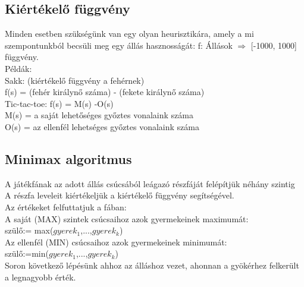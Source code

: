 \documentclass{article}
\begin{document}
	 \subsection{Kiértékelő függvény}
	 Minden esetben szükségünk van egy olyan heurisztikára, amely a mi szempontunkból becsüli meg egy állás hasznosságát: f: Állások $\Rightarrow$ [-1000, 1000] függvény.\\
	 Példák: \\
	 Sakk: (kiértékelő függvény a fehérnek)\\
	 f(s) = (fehér királynő száma) - (fekete királynő száma)\\
	 Tic-tac-toe: f(s) = M(s) -O(s)\\
	 M(s) = a saját lehetőséges győztes vonalaink száma\\
	 O(s) = az ellenfél lehetséges győztes vonalaink száma\\
	 
	 \subsection{Minimax algoritmus}
	 A játékfának az adott állás csúcsából leágazó részfáját felépítjük néhány szintig\\
	 A részfa leveleit kiértékeljük a kiértékelő függvény segítségével.\\
	 Az értékeket felfuttatjuk a fában:\\
	 \hspace*{1em} A saját (MAX) szintek csúcsaihoz azok gyermekeinek maximumát:\\
	 \hspace*{1em} szülő:= max($gyerek_1$,...,$gyerek_k$)\\
	 \hspace*{1em} Az ellenfél (MIN) csúcsaihoz azok gyermekeinek minimumát:\\ 
	 \hspace*{1em} szülő:=min($gyerek_1$,...,$gyerek_k$)\\
	 Soron következő lépésünk ahhoz az álláshoz vezet, ahonnan a gyökérhez felkerült a legnagyobb érték.
	 
	 
	 
	
		
\end{document}
